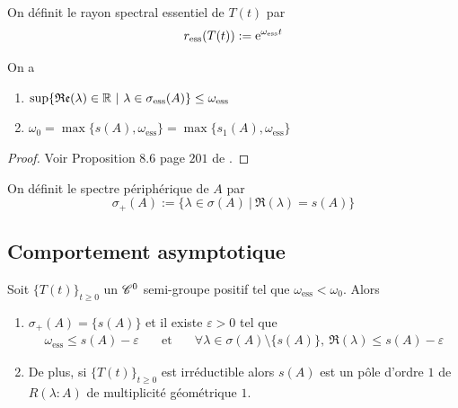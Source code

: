 \begin{definition}
    On définit le \textcolor{astral}{rayon spectral essentiel} de $T(t)$ par 
    \begin{equation*}
        r_{\text{ess}}(T(t)) := \mathrm{e}^{\omega_{\text{ess}}t}
    \end{equation*}
\end{definition}

\begin{proposition}\label{prop_lien_type_borne_spectrale}
    On a 
    \begin{enumerate}
        \item $\sup\{\Re(\lambda) \in \bbR \ | \ \lambda \in \sigma_{\text{ess}}(A)\} \leq \omega_{\text{ess}}$
        \item $\omega_0 = \max\{s(A),\omega_{\text{ess}}\}=\max\{s_1(A), \omega_{\text{ess}}\}$
    \end{enumerate}
\end{proposition}

\begin{proof}
    Voir Proposition $8.6$ page $201$ de \cite{Clement1987}.
\end{proof}

\begin{definition}
    On définit le \textcolor{astral}{spectre périphérique de $A$} par 
    \begin{equation*}
        \sigma_+(A) := \{\lambda \in \sigma(A) \ | \ \Re(\lambda)=s(A)\}
    \end{equation*}
\end{definition}

\subsection{Comportement asymptotique}
\begin{theorem}\label{thm_asymptotique1}
    Soit $\big\{T(t)\big\}_{t \geq 0}$ un $\mathscr{C}^0$ semi-groupe positif tel que $\omega_{\text{ess}} < \omega_0$. Alors 
    \begin{enumerate}
        \item $\sigma_+(A)=\{s(A)\}$ et il existe $\varepsilon >0$ tel que 
        \begin{eqnarray*}
            \omega_{\text{ess}} \leq s(A)-\varepsilon \ \ \ &\text{ et }& \ \ \ \forall \lambda \in \sigma(A) \setminus \{s(A)\}, \ \Re(\lambda) \leq s(A)- \varepsilon
        \end{eqnarray*}
        \item De plus, si $\big\{T(t)\big\}_{t \geq 0}$ est irréductible alors $s(A)$ est un pôle d'ordre $1$ de $R(\lambda :A)$ de multiplicité géométrique $1$.
    \end{enumerate}
\end{theorem}

